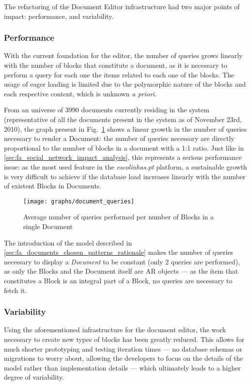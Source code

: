 The refactoring of the Document Editor infrastructure had two major points of impact: performance, and variability.

\subsubsection{Performance}

With the current foundation for the editor, the number of queries grows linearly with the number of blocks that constitute a document, as it is necessary to perform a query for each one the items related to each one of the blocks. The usage of eager loading is limited due to the polymorphic nature of the blocks and each respective content, which is unknown \emph{a priori}.

From an universe of 3990 documents currently residing in the system (representative of all the documents present in the system as of November 23rd, 2010), the graph present in Fig.~\ref{fig:queries_per_blocks_in_document} shows a linear growth in the number of queries necessary to render a Document: the number of queries necessary are directly proportional to the number of blocks in a document with a 1:1 ratio. Just like in \ref{sec:fa_social_network_impact_analysis}, this represents a serious performance issue: as the most used feature in the \emph{escolinhas.pt} platform, a sustainable growth is very difficult to achieve if the database load increases linearly with the number of existent Blocks in Documents.

\begin{figure}[h]
  \centering
  \texttt{[image: graphs/document\_queries]}
  \caption{Average number of queries performed per number of Blocks in a single Document}
  \label{fig:queries_per_blocks_in_document}
\end{figure}

The introduction of the model described in \ref{sec:fa_documents_chosen_patterns_rationale} makes the number of queries necessary to display a \emph{Document} to be constant (only 2 queries are performed), as only the Blocks and the Document itself are AR objects --- as the item that constitutes a Block is an integral part of a Block, no queries are necessary to fetch it.

\subsubsection{Variability}

Using the aforementioned infrastructure for the document editor, the work necessary to create new types of blocks has been greatly reduced. This allows for much shorter prototyping and testing iteration times --- no database schemas or migrations to worry about, allowing the developers to focus on the details of the model rather than implementation details --- which ultimately leads to a higher degree of variability.



